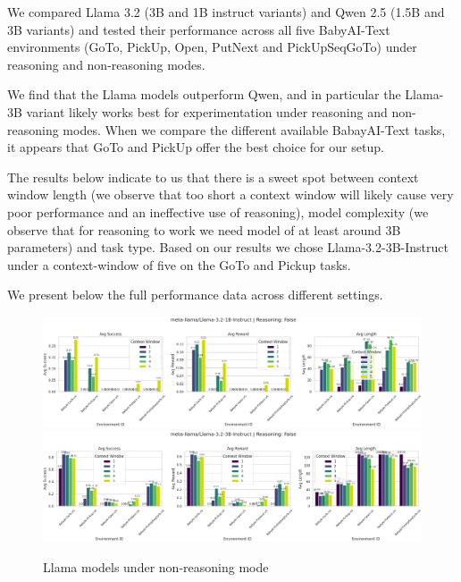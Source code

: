\documentclass[11pt,a4paper]{article}
\begin{document}
We compared Llama 3.2 (3B and 1B instruct variants) and Qwen 2.5 (1.5B and 3B variants) and tested their performance across all five BabyAI-Text environments (GoTo, PickUp, Open, PutNext and PickUpSeqGoTo) under reasoning and non-reasoning modes.

We find that the Llama models outperform Qwen, and in particular the Llama-3B variant likely works best for experimentation under reasoning and non-reasoning modes. When we compare the different available BabayAI-Text tasks, it appears that GoTo and PickUp offer the best choice for our setup. 

The results below indicate to us that there is a sweet spot between context window length (we observe that too short a context window will likely cause very poor performance and an ineffective use of reasoning), model complexity (we observe that for reasoning to work we need model of at least around 3B parameters) and task type. Based on our results we chose Llama-3.2-3B-Instruct under a context-window of five on the GoTo and Pickup tasks. 

We present below the full performance data across different settings. 

\begin{figure}[H]
    \centering
    \includegraphics[width=1\linewidth]
    {../images/baseline_llama_1B_NR.png}
    \includegraphics[width=1\linewidth]
    {../images/baseline_llama_3B_NR.png}
    \caption{Llama models under non-reasoning mode}
\end{figure}
\end{document}
